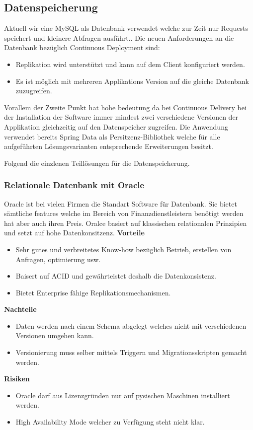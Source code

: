 \subsection{Datenspeicherung}

Aktuell wir eine MySQL als Datenbank verwendet welche zur Zeit nur Requests speichert und kleinere Abfragen ausführt.. Die neuen Anforderungen an die Datenbank bezüglich Continuous Deployment sind:
\begin{itemize}
	\item Replikation wird unterstützt und kann auf dem Client konfiguriert werden.
	\item Es ist möglich mit mehreren Applikations Version auf die gleiche Datenbank zuzugreifen.
\end{itemize}
Vorallem der Zweite Punkt hat hohe bedeutung da bei Continuous Delivery bei der Installation der Software immer mindest zwei verschiedene Versionen der Applikation gleichzeitig auf den Datenspeicher zugreifen. Die Anwendung verwendet bereits Spring Data als Persitzenz-Bibliothek welche für alle aufgeführten Lösungsvarianten entsprechende Erweiterungen besitzt.

Folgend die einzlenen Teillösungen für die Datenspeicherung.

\subsubsection{Relationale Datenbank mit Oracle}

Oracle ist bei vielen Firmen die Standart Software für Datenbank. Sie bietet sämtliche features welche im Bereich von Finanzdienstleistern benötigt werden hat aber auch ihren Preis. Oralce basiert auf klassischen relationalen Prinzipien und setzt auf hohe Datenkonsitzenz.
\newline
\newline
\textbf{Vorteile}
\begin{itemize}
	\item Sehr gutes und verbreitetes Know-how bezüglich Betrieb, erstellen von Anfragen, optimierung usw.
	\item Baisert auf \Gls{ACID} und gewährteistet deshalb die Datenkonsistenz.
	\item Bietet Enterprise fähige Replikationsmechanismen.
\end{itemize}
\textbf{Nachteile}
\begin{itemize}
	\item Daten werden nach einem Schema abgelegt welches nicht mit verschiedenen Versionen umgehen kann.
	\item Versionierung muss selber mittels Triggern und Migrationsskripten gemacht werden.	
\end{itemize}
\textbf{Risiken}
\begin{itemize}
	\item Oracle darf aus Lizenzgründen nur auf pysischen Maschinen installiert werden.
	\item High Availability Mode welcher zu Verfügung steht nicht klar.
\end{itemize}


